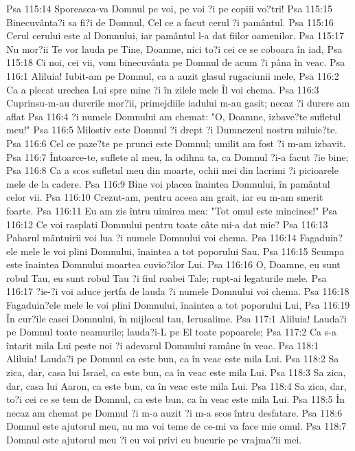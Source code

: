 Psa 115:14  Sporeasca-va Domnul pe voi, pe voi ?i pe copiii vo?tri!
Psa 115:15  Binecuvânta?i sa fi?i de Domnul, Cel ce a facut cerul ?i pamântul.
Psa 115:16  Cerul cerului este al Domnului, iar pamântul l-a dat fiilor oamenilor.
Psa 115:17  Nu mor?ii Te vor lauda pe Tine, Doamne, nici to?i cei ce se coboara în iad,
Psa 115:18  Ci noi, cei vii, vom binecuvânta pe Domnul de acum ?i pâna în veac.
Psa 116:1  Aliluia! Iubit-am pe Domnul, ca a auzit glasul rugaciunii mele,
Psa 116:2  Ca a plecat urechea Lui spre mine ?i în zilele mele Îl voi chema.
Psa 116:3  Cuprinsu-m-au durerile mor?ii, primejdiile iadului m-au gasit; necaz ?i durere am aflat
Psa 116:4  ?i numele Domnului am chemat: "O, Doamne, izbave?te sufletul meu!"
Psa 116:5  Milostiv este Domnul ?i drept ?i Dumnezeul nostru miluie?te.
Psa 116:6  Cel ce paze?te pe prunci este Domnul; umilit am fost ?i m-am izbavit.
Psa 116:7  Întoarce-te, suflete al meu, la odihna ta, ca Domnul ?i-a facut ?ie bine;
Psa 116:8  Ca a scos sufletul meu din moarte, ochii mei din lacrimi ?i picioarele mele de la cadere.
Psa 116:9  Bine voi placea înaintea Domnului, în pamântul celor vii.
Psa 116:10  Crezut-am, pentru aceea am grait, iar eu m-am smerit foarte.
Psa 116:11  Eu am zis întru uimirea mea: "Tot omul este mincinos!"
Psa 116:12  Ce voi rasplati Domnului pentru toate câte mi-a dat mie?
Psa 116:13  Paharul mântuirii voi lua ?i numele Domnului voi chema.
Psa 116:14  Fagaduin?ele mele le voi plini Domnului, înaintea a tot poporului Sau.
Psa 116:15  Scumpa este înaintea Domnului moartea cuvio?ilor Lui.
Psa 116:16  O, Doamne, eu sunt robul Tau, eu sunt robul Tau ?i fiul roabei Tale; rupt-ai legaturile mele.
Psa 116:17  ?ie-?i voi aduce jertfa de lauda ?i numele Domnului voi chema.
Psa 116:18  Fagaduin?ele mele le voi plini Domnului, înaintea a tot poporului Lui,
Psa 116:19  În cur?ile casei Domnului, în mijlocul tau, Ierusalime.
Psa 117:1  Aliluia! Lauda?i pe Domnul toate neamurile; lauda?i-L pe El toate popoarele;
Psa 117:2  Ca s-a întarit mila Lui peste noi ?i adevarul Domnului ramâne în veac.
Psa 118:1  Aliluia! Lauda?i pe Domnul ca este bun, ca în veac este mila Lui.
Psa 118:2  Sa zica, dar, casa lui Israel, ca este bun, ca în veac este mila Lui.
Psa 118:3  Sa zica, dar, casa lui Aaron, ca este bun, ca în veac este mila Lui.
Psa 118:4  Sa zica, dar, to?i cei ce se tem de Domnul, ca este bun, ca în veac este mila Lui.
Psa 118:5  În necaz am chemat pe Domnul ?i m-a auzit ?i m-a scos întru desfatare.
Psa 118:6  Domnul este ajutorul meu, nu ma voi teme de ce-mi va face mie omul.
Psa 118:7  Domnul este ajutorul meu ?i eu voi privi cu bucurie pe vrajma?ii mei.
